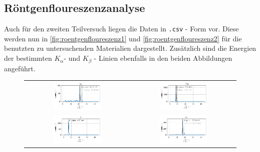 \documentclass[ngerman]{scrartcl}
\begin{document}
\subsection{Röntgenfloureszenzanalyse}
\label{subsec:roentgenfloureszenzanalyse}
Auch für den zweiten Teilversuch liegen die Daten in \texttt{.csv} - Form vor. Diese werden nun in \autoref{fig:roentgenfloureszenz1} und \autoref{fig:roentgenfloureszenz2} für die benutzten zu untersuchenden Materialien dargestellt. Zusätzlich sind die Energien der bestimmten $K_{\alpha}$- und $K_{\beta}$ - Linien ebenfalls in den beiden Abbildungen angeführt.
\begin{figure}[H]
    \centering
    \begin{tabular}{cc}
        \includegraphics[width=0.48\textwidth]{../plots/roentgen_data_1.pdf} &
        \includegraphics[width=0.48\textwidth]{../plots/roentgen_data_2.pdf}   \\
        \includegraphics[width=0.48\textwidth]{../plots/roentgen_data_3.pdf} &
        \includegraphics[width=0.48\textwidth]{../plots/roentgen_data_4.pdf}   \\

\end{tabular}
\end{figure}
\end{document}
